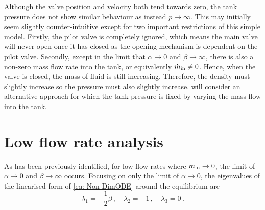 \newpage
Although the valve position and velocity both tend towards zero, the tank pressure does not show similar behaviour as instead $p \rightarrow \infty$. This may initially seem slightly counter-intuitive except for two important restrictions of this simple model. Firstly, the pilot valve is completely ignored, which means the main valve will never open once it has closed as the opening mechanism is dependent on the pilot valve. Secondly, except in the limit that $\alpha \rightarrow 0$ and $\beta \rightarrow \infty$, there is also a non-zero mass flow rate into the tank, or equivalently $\dot{m}_{\rm{in}} \neq 0$. Hence, when the valve is closed, the mass of fluid is still increasing. Therefore, the density must slightly increase so the pressure must also slightly increase.  will consider an alternative approach for which the tank pressure is fixed by varying the mass flow into the tank.




\section{Low flow rate analysis}

As has been previously identified, for low flow rates where $\dot{m}_{\rm{in}} \rightarrow 0$, the limit of $\alpha \rightarrow 0$ and $\beta \rightarrow \infty$ occurs. Focusing on only the limit of $\alpha \rightarrow 0$, the eigenvalues of the linearised form of \cref{eq: Non-DimODE} around the equilibrium are
~ %
\begin{equation*}
    \lambda_1 = - \frac{1}{2}\beta \, , \quad
    \lambda_2 = -1 \, , \quad
    \lambda_3 = 0 \, .
\end{equation*}

